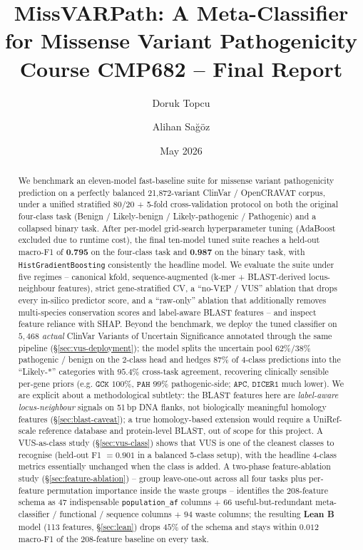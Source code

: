 \documentclass[11pt,a4paper]{article}
\title{\textbf{MissVARPath:} A Meta-Classifier for Missense Variant Pathogenicity\\
\large Course CMP682 -- Final Report}
\author{Doruk Topcu \and Alihan Sa\u{g}\"{o}z}
\date{May 2026}
\begin{document}
\maketitle

\begin{abstract}
We benchmark an eleven-model fast-baseline suite for missense variant pathogenicity
prediction on a perfectly balanced 21{,}872-variant ClinVar / OpenCRAVAT corpus,
under a unified stratified 80/20 + 5-fold cross-validation protocol on both the
original four-class task (Benign / Likely-benign / Likely-pathogenic / Pathogenic)
and a collapsed binary task. After per-model grid-search hyperparameter tuning
(AdaBoost excluded due to runtime cost), the final ten-model tuned suite reaches
a held-out macro-F1 of \textbf{0.795} on the four-class task and \textbf{0.987}
on the binary task, with \texttt{HistGradientBoosting} consistently the headline
model. We evaluate the suite under five regimes -- canonical kfold, sequence-augmented
(k-mer + BLAST-derived locus-neighbour features), strict gene-stratified CV, a
``no-VEP / VUS'' ablation that drops every in-silico predictor score, and a
``raw-only'' ablation that additionally removes multi-species conservation scores
and label-aware BLAST features -- and inspect feature reliance with SHAP. Beyond
the benchmark, we deploy the tuned classifier on $5{,}468$ \emph{actual} ClinVar
Variants of Uncertain Significance annotated through the same pipeline
(\S\ref{sec:vus-deployment}); the model splits the uncertain pool $62\% / 38\%$
pathogenic / benign on the 2-class head and hedges $87\%$ of 4-class predictions
into the ``Likely-*'' categories with $95.4\%$ cross-task agreement, recovering
clinically sensible per-gene priors (e.g. $\texttt{GCK}$ $100\%$, $\texttt{PAH}$
$99\%$ pathogenic-side; $\texttt{APC}$, $\texttt{DICER1}$ much lower). We are
explicit about a methodological subtlety: the BLAST features here are
\emph{label-aware locus-neighbour} signals on 51\,bp DNA flanks, not biologically
meaningful homology features (\S\ref{sec:blast-caveat}); a true homology-based
extension would require a UniRef-scale reference database and protein-level BLAST,
out of scope for this project. A VUS-as-class study (\S\ref{sec:vus-class}) shows
that VUS is one of the cleanest classes to recognise (held-out F1 $=0.901$ in a
balanced 5-class setup), with the headline 4-class metrics essentially unchanged
when the class is added. A two-phase feature-ablation study
(\S\ref{sec:feature-ablation}) -- group leave-one-out across all four tasks plus
per-feature permutation importance inside the waste groups -- identifies the
$208$-feature schema as $47$ indispensable \texttt{population\_af} columns
$+$ $66$ useful-but-redundant meta-classifier / functional / sequence columns
$+$ $94$ waste columns; the resulting \textbf{Lean B} model (113 features,
\S\ref{sec:lean}) drops $45\%$ of the schema and stays within $0.012$ macro-F1
of the $208$-feature baseline on every task.
\end{abstract}
\end{document}
